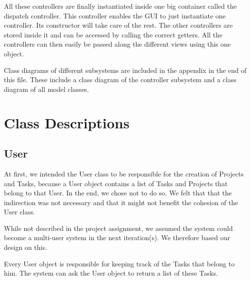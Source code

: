         All these controllers are finally instantiated inside one big container called the dispatch controller. This controller enables the GUI to just instantiate one controller. Its constructor will take care of the rest. The other controllers are stored inside it and can be accessed by calling the correct getters. All the controllers can then easily be passed along the different views using this one object.

Class diagrams of different subsystems are included in the appendix in the end of this file. These include a class diagram of the controller subsystem and a class diagram of all model classes.

	\section{Class Descriptions}
		
			\subsection{User}
			At first, we intended the User class to be responsible for the creation of Projects and Tasks, because a User object contains a list of Tasks and Projects that belong to that User. In the end, we chose not to do so. We felt that that the indirection was not necessary and that it might not benefit the cohesion of the User class.

			While not described in the project assignment, we assumed the system could become a multi-user system in the next iteration(s). We therefore based our design on this.

			Every User object is responsible for keeping track of the Tasks that belong to him. The system can ask the User object to return a list of these Tasks.

